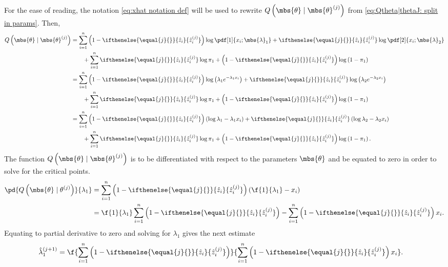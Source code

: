 \documentclass{tufte-handout}
\newcommand{\zhat}[2][{}]{\ifthenelse{\equal{#1}{}}{\hat{z}_{#2}}{\hat{z}_{#2}^{(#1)}}}
\begin{document}
    For the ease of reading, the notation \eqref{eq:xhat notation def} will be used to rewrite $Q\left( \mbs{\theta}\mid\mbs{\theta}^{(j)} \right)$ from \eqref{eq:Qtheta|thetaJ: split in params}. Then, 
    \begin{align}
        Q\left( \mbs{\theta} \mid \mbs{\theta}^{(j)} \right)
        &=
        \sum_{i=1}^{n} \left(1-\zhat[j]{i}\right) \log \pdf[1]{{x}_{i}; \mbs{\lambda}_{1}} + \zhat[j]{i}\log\pdf[2]{{x}_{i}; \mbs{\lambda}_{2}}
        \nonumber\\&\qquad
        +\sum_{i=1}^{n}\zhat[j]{i}\log \pi_{1} + \left(1-\zhat[j]{i}\right)\log\left( 1-\pi_{1} \right)\\
        &=
        \sum_{i=1}^{n} \left(1-\zhat[j]{i}\right) \log \left( \lambda_{1}e^{-\lambda_{1} x_{i}} \right) + \zhat[j]{i}\log\left(\lambda_{2}e^{-\lambda_{2} x_{i}}\right)
        \nonumber\\&\qquad
        +\sum_{i=1}^{n}\zhat[j]{i}\log \pi_{1} + \left(1-\zhat[j]{i}\right)\log\left( 1-\pi_{1} \right)\\
        &=
        \sum_{i=1}^{n} \left(1-\zhat[j]{i}\right)  \left( \log\lambda_{1} -\lambda_{1} x_{i} \right) + \zhat[j]{i}\left(\log\lambda_{2} -\lambda_{2} x_{i}\right)
        \nonumber\\&\qquad
        +\sum_{i=1}^{n}\zhat[j]{i}\log \pi_{1} + \left(1-\zhat[j]{i}\right)\log\left( 1-\pi_{1} \right).
    \end{align}
    The function $Q\left( \mbs{\theta}\mid \mbs{\theta}^{(j)} \right)$ is to be differentiated with respect to the parameters $\mbs{\theta}$ and be equated to zero in order to solve for the critical points.
    \begin{align}
        \pd{
            Q\left( \mbs{\theta}\mid{\theta}^{(j)} \right)
        }{
            \lambda_{1}
        }
        &= 
        \sum_{i=1}^{n} \left(1-\zhat[j]{i}\right)  \left( \f{1}{\lambda_{1}}- x_{i} \right)\\
        &= 
        \f{1}{\lambda_{1}}\sum_{i=1}^{n} \left(1-\zhat[j]{i}\right) 
        -
        \sum_{i=1}^{n} \left(1-\zhat[j]{i}\right) x_{i}.
    \end{align}
    Equating to partial derivative to zero and solving for $\lambda_{1}$ gives the next estimate
    \begin{align}
        \hat{\lambda}_{1}^{(j+1)} 
        &= 
        \f{
            \sum_{i=1}^{n} \left(1-\zhat[j]{i}\right)
        }{
            \sum_{i=1}^{n} \left(1-\zhat[j]{i}\right) x_{i}  
        }.
    \end{align}
\end{document}

